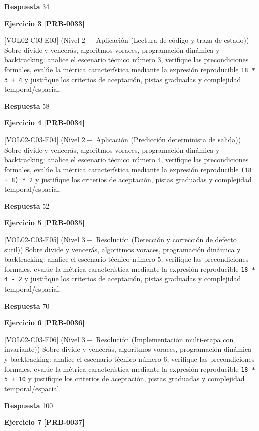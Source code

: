 \documentclass{book}
\begin{document}
\noindent\textbf{Respuesta} 34

\noindent\textbf{Ejercicio 3 [PRB-0033]}

[VOL02-C03-E03] (Nivel \(2 -\) Aplicación (Lectura de código y traza de estado)) Sobre divide y vencerás, algoritmos voraces, programación dinámica y backtracking: analice el escenario técnico número 3, verifique las precondiciones formales, evalúe la métrica característica mediante la expresión reproducible \texttt{18 * 3 + 4} y justifique los criterios de aceptación, pistas graduadas y complejidad temporal/espacial.

\noindent\textbf{Respuesta} 58

\noindent\textbf{Ejercicio 4 [PRB-0034]}

[VOL02-C03-E04] (Nivel \(2 -\) Aplicación (Predicción determinista de salida)) Sobre divide y vencerás, algoritmos voraces, programación dinámica y backtracking: analice el escenario técnico número 4, verifique las precondiciones formales, evalúe la métrica característica mediante la expresión reproducible \texttt{(18 + 8) * 2} y justifique los criterios de aceptación, pistas graduadas y complejidad temporal/espacial.

\noindent\textbf{Respuesta} 52

\noindent\textbf{Ejercicio 5 [PRB-0035]}

[VOL02-C03-E05] (Nivel \(3 -\) Resolución (Detección y corrección de defecto sutil)) Sobre divide y vencerás, algoritmos voraces, programación dinámica y backtracking: analice el escenario técnico número 5, verifique las precondiciones formales, evalúe la métrica característica mediante la expresión reproducible \texttt{18 * 4 - 2} y justifique los criterios de aceptación, pistas graduadas y complejidad temporal/espacial.

\noindent\textbf{Respuesta} 70

\noindent\textbf{Ejercicio 6 [PRB-0036]}

[VOL02-C03-E06] (Nivel \(3 -\) Resolución (Implementación multi-etapa con invariante)) Sobre divide y vencerás, algoritmos voraces, programación dinámica y backtracking: analice el escenario técnico número 6, verifique las precondiciones formales, evalúe la métrica característica mediante la expresión reproducible \texttt{18 * 5 + 10} y justifique los criterios de aceptación, pistas graduadas y complejidad temporal/espacial.

\noindent\textbf{Respuesta} 100

\noindent\textbf{Ejercicio 7 [PRB-0037]}
\end{document}

